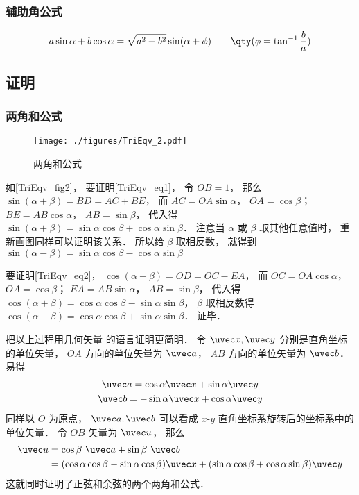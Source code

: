 \subsubsection{辅助角公式}
\begin{equation}
a\sin \alpha + b\cos \alpha = \sqrt{a^2+b^2}\sin(\alpha + \phi) \qquad \qty(\phi = \tan^{-1}\frac{b}{a})
\end{equation}

\subsection{证明}
\subsubsection{两角和公式}
\begin{figure}[ht]
\centering
\texttt{[image: ./figures/TriEqv\_2.pdf]}
\caption{两角和公式} \label{TriEqv_fig2}
\end{figure}
如\autoref{TriEqv_fig2}， 要证明\autoref{TriEqv_eq1}， 令 $OB = 1$， 那么 $\sin(\alpha+\beta) = BD = AC + BE$， 而 $AC = OA \sin\alpha$， $OA = \cos\beta$； $BE = AB\cos\alpha$， $AB = \sin\beta$， 代入得 $\sin(\alpha+\beta) = \sin\alpha\cos\beta + \cos\alpha\sin\beta$． 注意当 $\alpha$ 或 $\beta$ 取其他任意值时， 重新画图同样可以证明该关系． 所以给 $\beta$ 取相反数， 就得到 $\sin(\alpha-\beta) = \sin\alpha\cos\beta - \cos\alpha\sin\beta$

要证明\autoref{TriEqv_eq2}， $\cos(\alpha+\beta) = OD = OC - EA$， 而 $OC = OA\cos\alpha$， $OA = \cos\beta$； $EA = AB\sin\alpha$， $AB = \sin\beta$， 代入得 $\cos(\alpha+\beta) = \cos\alpha\cos\beta - \sin\alpha\sin\beta$， $\beta$ 取相反数得 $\cos(\alpha-\beta) = \cos\alpha\cos\beta + \sin\alpha\sin\beta$． 证毕．

把以上过程用几何矢量 的语言证明更简明． 令 $\uvec x, \uvec y$ 分别是直角坐标的单位矢量， $OA$ 方向的单位矢量为 $\uvec a$， $AB$ 方向的单位矢量为 $\uvec b$． 易得
\begin{gather}
\uvec a = \cos\alpha \uvec x + \sin\alpha \uvec y\\
\uvec b = -\sin\alpha \uvec x + \cos\alpha \uvec y
\end{gather}
同样以 $O$ 为原点， $\uvec a, \uvec b$ 可以看成 $x$-$y$ 直角坐标系旋转后的坐标系中的单位矢量． 令 $OB$ 矢量为 $\uvec u$， 那么
\begin{equation}
\begin{aligned}
\uvec u &= \cos\beta\ \uvec a + \sin\beta\ \uvec b\\
&= (\cos\alpha\cos\beta - \sin\alpha\cos\beta)\uvec x + (\sin\alpha\cos\beta + \cos\alpha\sin\beta)\uvec y
\end{aligned}
\end{equation}
这就同时证明了正弦和余弦的两个两角和公式．

